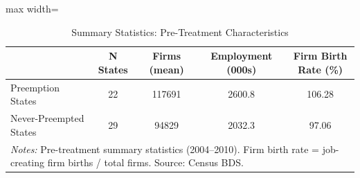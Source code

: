 \begin{table}[htbp]
\centering
\caption{Summary Statistics: Pre-Treatment Characteristics}
\label{tab:summary}
\begin{adjustbox}{max width=\textwidth}\small\begin{tabular}{lcccc}
\hline\hline
 & N States & Firms (mean) & Employment (000s) & Firm Birth Rate (\%) \\
\hline
Preemption States & 22 & 117691 & 2600.8 & 106.28 \\
Never-Preempted States & 29 & 94829 & 2032.3 & 97.06 \\
\hline
\multicolumn{5}{l}{\textit{Notes:} Pre-treatment summary statistics (2004--2010). Firm birth rate = job-creating firm births / total firms. Source: Census BDS.}\\
\hline
\end{tabular}\end{adjustbox}
\end{table}

